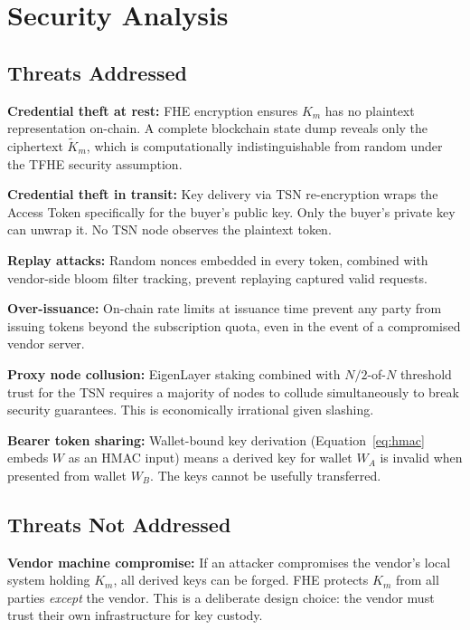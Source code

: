 \documentclass[conference]{IEEEtran}
\begin{document}
\section{Security Analysis}
\label{sec:security}

\subsection{Threats Addressed}

\textbf{Credential theft at rest:} FHE encryption ensures $K_m$ has no plaintext
representation on-chain. A complete blockchain state dump reveals only the ciphertext
$\tilde{K}_m$, which is computationally indistinguishable from random under the
TFHE security assumption.

\textbf{Credential theft in transit:} Key delivery via TSN re-encryption wraps the
Access Token specifically for the buyer's public key. Only the buyer's private key
can unwrap it. No TSN node observes the plaintext token.

\textbf{Replay attacks:} Random nonces embedded in every token, combined with
vendor-side bloom filter tracking, prevent replaying captured valid requests.

\textbf{Over-issuance:} On-chain rate limits at issuance time prevent any party
from issuing tokens beyond the subscription quota, even in the event of a compromised
vendor server.

\textbf{Proxy node collusion:} EigenLayer staking combined with $N/2$-of-$N$
threshold trust for the TSN requires a majority of nodes to collude simultaneously
to break security guarantees. This is economically irrational given slashing.

\textbf{Bearer token sharing:} Wallet-bound key derivation (Equation~\ref{eq:hmac}
embeds $W$ as an HMAC input) means a derived key for wallet $W_A$ is invalid when
presented from wallet $W_B$. The keys cannot be usefully transferred.

\subsection{Threats Not Addressed}

\textbf{Vendor machine compromise:} If an attacker compromises the vendor's local
system holding $K_m$, all derived keys can be forged. FHE protects $K_m$ from
all parties \emph{except} the vendor. This is a deliberate design choice: the vendor
must trust their own infrastructure for key custody.
\end{document}
